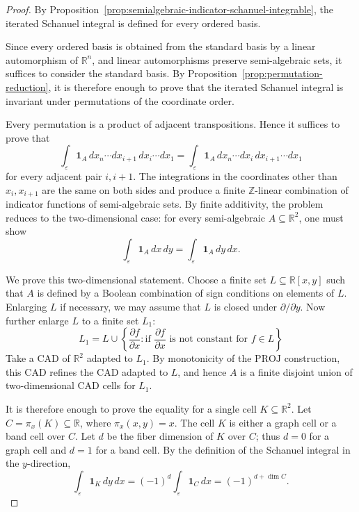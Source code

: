 \documentclass[10pt,a4paper]{amsart}
\begin{document}
\begin{proof}
By Proposition~\ref{prop:semialgebraic-indicator-schanuel-integrable},
the iterated Schanuel integral is defined for every ordered basis.

Since every ordered basis is obtained from the standard basis by a linear automorphism of $\mathbb R^n$, 
and linear automorphisms preserve semi-algebraic sets, it suffices to consider the standard basis. 
By Proposition~\ref{prop:permutation-reduction}, it is therefore enough to prove that the iterated Schanuel integral is invariant under permutations of the coordinate order.

Every permutation is a product of adjacent transpositions.  Hence it suffices
to prove that
\[
  \int_{\varepsilon} \mathbf{1}_A\,
  dx_n\cdots dx_{i+1}\,dx_i\cdots dx_1
  =
  \int_{\varepsilon} \mathbf{1}_A\,
  dx_n\cdots dx_i\,dx_{i+1}\cdots dx_1
\]
for every adjacent pair \(i,i+1\).  The integrations in the coordinates other
than \(x_i,x_{i+1}\) are the same on both sides and produce a finite
\(\mathbb{Z}\)-linear combination of indicator functions of semi-algebraic
sets.  By finite additivity, the problem reduces to the two-dimensional case:
for every semi-algebraic \(A\subseteq\mathbb{R}^2\), one must show
\[
  \int_{\varepsilon}\mathbf{1}_A\,dx\,dy
  =
  \int_{\varepsilon}\mathbf{1}_A\,dy\,dx .
\]

We prove this two-dimensional statement.  Choose a finite set
\(L\subseteq\mathbb{R}[x,y]\) such that \(A\) is defined by a Boolean
combination of sign conditions on elements of \(L\).  Enlarging \(L\) if
necessary, we may assume that \(L\) is closed under \(\partial/\partial y\).
Now further enlarge \(L\) to a finite set \(L_1\):
$$ L_1= L\cup \left\{\frac{\partial f}{\partial x}: 
\text{if }\frac{\partial f}{\partial x} \text{ is not constant for $f\in L$}\right\} $$
Take a CAD of \(\mathbb{R}^2\)
adapted to \(L_1\).  By monotonicity of the $\text{PROJ}$ construction, this CAD 
refines the CAD adapted to \(L\), and hence \(A\) is a finite disjoint union of
two-dimensional CAD cells for \(L_1\).

It is therefore enough to prove the equality for a single cell
\(K\subseteq\mathbb{R}^2\).  Let \(C=\pi_x(K)\subseteq\mathbb{R}\), where
\(\pi_x(x,y)=x\).  The cell \(K\) is either a graph cell or a band cell over
\(C\).  Let \(d\) be the fiber dimension of \(K\) over \(C\); thus \(d=0\) for a
graph cell and \(d=1\) for a band cell.  By the definition of the Schanuel
integral in the \(y\)-direction,
\[
  \int_{\varepsilon}\mathbf{1}_K\,dy\,dx
  =
  (-1)^d
  \int_{\varepsilon}\mathbf{1}_C\,dx
  =
  (-1)^{d+\dim C}.
\]


\end{proof}
\end{document}
